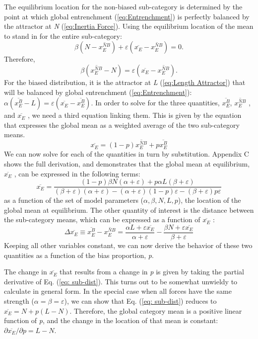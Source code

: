 The equilibrium location for the non-biased sub-category is determined
by the point at which global entrenchment (\ref{eq:Entrenchment})
is perfectly balanced by the attractor at \emph{N} (\ref{eq:Inertia Force}).
Using the equilibrium location of the mean to stand in for the entire
sub-category: \[\beta\left(N-\overline{x_{E}^{NB}}\right)+\varepsilon\left(\overline{x_{E}}-\overline{x_{E}^{NB}}\right)=0\text{.}\]
Therefore, \[\beta\left(\overline{x_{E}^{NB}}-N\right)=\varepsilon\left(\overline{x_{E}}-\overline{x_{E}^{NB}}\right)\text{.}\]
For the biased distribution, it is the attractor at \emph{L} (\ref{eq:Length Attractor})
that will be balanced by global entrenchment (\ref{eq:Entrenchment}):
$\alpha(\overline{x_{E}^{B}}-L)=\varepsilon(\overline{x_{E}}-\overline{x_{E}^{B}})$.
In order to solve for the three quantities, $\overline{x_{E}^{B}}$,
$\overline{x_{E}^{NB}}$ , and $\overline{x_{E}}$ , we need a third
equation linking them. This is given by the equation that expresses
the global mean as a weighted average of the two sub-category means.
\begin{equation}
\overline{x_{E}}=(1-p)\overline{x_{E}^{NB}}+p\overline{x_{E}^{B}}\label{eq:weighted mean}
\end{equation}
We can now solve for each of the quantities in turn by substitution.
Appendix C shows the full derivation, and demonstrates that the global
mean at equilibrium, $\overline{x_{E}}$ , can be expressed in the
following terms:
\begin{equation}
\overline{x_{E}}=\frac{(1-p)\beta N(\alpha+\varepsilon)+p\alpha L(\beta+\varepsilon)}{(\beta+\varepsilon)(\alpha+\varepsilon)-(\alpha+\varepsilon)(1-p)\varepsilon-(\beta+\varepsilon)p\varepsilon}\label{eq: sub-dist}
\end{equation}
as a function of the set of model parameters ($\alpha,\beta,N,L,p$),
the location of the global mean at equilibrium. The other quantity
of interest is the distance between the sub-category means, which
can be expressed as a function of $\overline{x_{E}}$ :
\begin{equation}
\Delta\overline{x_{E}}\equiv\overline{x_{E}^{B}}-\overline{x_{E}^{NB}}=\frac{\alpha L+\varepsilon\overline{x_{E}}}{\alpha+\varepsilon}-\frac{\beta N+\varepsilon\overline{x_{E}}}{\beta+\varepsilon}\label{eq:State Model-sep}
\end{equation}
Keeping all other variables constant, we can now derive the behavior
of these two quantities as a function of the bias proportion, \emph{p}. 

The change in $\overline{x_{E}}$ that results from a change in \emph{p}
is given by taking the partial derivative of Eq. (\ref{eq: sub-dist}).
This turns out to be somewhat unwieldy to calculate in general form.
In the special case when all forces have the same strength ($\alpha=\beta=\varepsilon$),
we can show that Eq. (\ref{eq: sub-dist}) reduces to $\overline{x_{E}}=N+p(L-N)$.
Therefore, the global category mean is a positive linear function
of \emph{p}, and the change in the location of that mean is constant:
${\partial\overline{x_{E}}}/{\partial p}=L-N$. 

